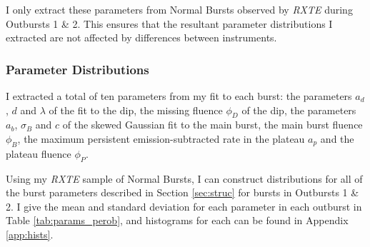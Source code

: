 \par I only extract these parameters from Normal Bursts observed by \indexrxte\textit{RXTE} during Outbursts 1 \& 2.  This ensures that the resultant parameter distributions I extracted are not affected by differences between instruments.

\subsubsection{Parameter Distributions}

\label{sec:hists}

\par I extracted a total of ten parameters from my fit to each burst: the parameters $a_d$, $d$ and $\lambda$ of the fit to the dip, the missing fluence $\phi_D$ of the dip, the parameters $a_b$, $\sigma_B$ and $c$ of the skewed Gaussian fit to the main burst, the main burst fluence $\phi_B$, the maximum persistent emission-subtracted rate in the plateau $a_p$ and the plateau fluence $\phi_P$.
\par Using my \indexrxte\textit{RXTE} sample of Normal Bursts, I can construct distributions for all of the burst parameters described in Section \ref{sec:struc} for bursts in Outbursts 1 \& 2.  I give the mean and standard deviation for each parameter in each outburst in Table \ref{tab:params_perob}, and histograms for each can be found in Appendix \ref{app:hists}.


